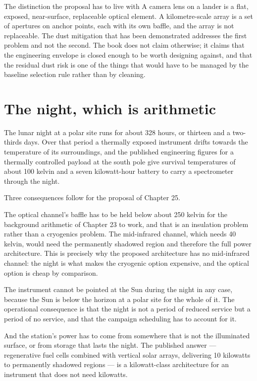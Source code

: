 \begin{seamnote}{The distinction the proposal has to live with}
A camera lens on a lander is a flat, exposed, near-surface, replaceable
optical element. A kilometre-scale array is a set of apertures on anchor
points, each with its own baffle, and the array is not replaceable. The
dust mitigation that has been demonstrated addresses the first problem and
not the second. The book does not claim otherwise; it claims that the
engineering envelope is closed enough to be worth designing against, and
that the residual dust risk is one of the things that would have to be
managed by the baseline selection rule rather than by cleaning.
\end{seamnote}

\section{The night, which is arithmetic}

The lunar night at a polar site runs for about 328 hours, or thirteen and a
two-thirds days. Over that period a thermally exposed instrument drifts
towards the temperature of its surroundings, and the published engineering
figures for a thermally controlled payload at the south pole give survival
temperatures of about 100 kelvin and a seven kilowatt-hour battery to carry
a spectrometer through the night.

Three consequences follow for the proposal of Chapter 25.

The optical channel's baffle has to be held below about 250 kelvin for the
background arithmetic of Chapter 23 to work, and that is an insulation
problem rather than a cryogenics problem. The mid-infrared channel, which
needs 40 kelvin, would need the permanently shadowed region and therefore
the full power architecture. This is precisely why the proposed architecture
has no mid-infrared channel: the night is what makes the cryogenic option
expensive, and the optical option is cheap by comparison.

The instrument cannot be pointed at the Sun during the night in any case,
because the Sun is below the horizon at a polar site for the whole of it.
The operational consequence is that the night is not a period of reduced
service but a period of no service, and that the campaign scheduling has to
account for it.

And the station's power has to come from somewhere that is not the
illuminated surface, or from storage that lasts the night. The published
answer --- regenerative fuel cells combined with vertical solar arrays,
delivering 10 kilowatts to permanently shadowed regions --- is a
kilowatt-class architecture for an instrument that does not need kilowatts.

